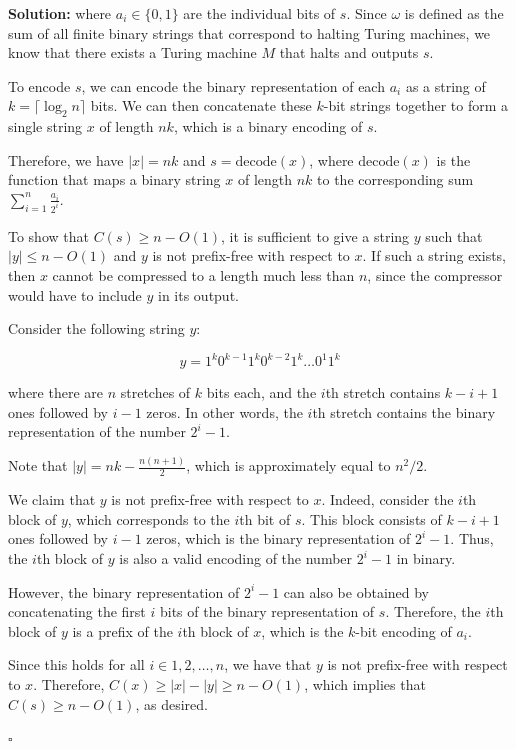 \documentclass[10pt]{article}
\newenvironment{solution}{\textbf{Solution:}}{\hfill$\square$}
\begin{document}
\begin{enumerate}
\begin{solution}
    where $a_i \in \{0,1\}$ are the individual bits of $s$. Since $\omega$ is defined as the sum of all finite binary strings that correspond to halting Turing machines, we know that there exists a Turing machine $M$ that halts and outputs $s$.
    
    To encode $s$, we can encode the binary representation of each $a_i$ as a string of $k = \lceil \log_2 n \rceil$ bits. We can then concatenate these $k$-bit strings together to form a single string $x$ of length $nk$, which is a binary encoding of $s$.
    
    Therefore, we have $|x| = nk$ and $s = \text{decode}(x)$, where $\text{decode}(x)$ is the function that maps a binary string $x$ of length $nk$ to the corresponding sum $\sum_{i=1}^n \frac{a_i}{2^i}$.
    
    To show that $C(s) \geq n-O(1)$, it is sufficient to give a string $y$ such that $|y| \leq n-O(1)$ and $y$ is not prefix-free with respect to $x$. If such a string exists, then $x$ cannot be compressed to a length much less than $n$, since the compressor would have to include $y$ in its output.
    
    Consider the following string $y$:
    
    \[y = 1^{k}0^{k-1}1^{k}0^{k-2}1^{k}\ldots 0^{1}1^{k}\]
    
    where there are $n$ stretches of $k$ bits each, and the $i$th stretch contains $k-i+1$ ones followed by $i-1$ zeros. In other words, the $i$th stretch contains the binary representation of the number $2^i-1$.
    
    Note that $|y| = nk - \frac{n(n+1)}{2}$, which is approximately equal to $n^2/2$.
    
    We claim that $y$ is not prefix-free with respect to $x$. Indeed, consider the $i$th block of $y$, which corresponds to the $i$th bit of $s$. This block consists of $k-i+1$ ones followed by $i-1$ zeros, which is the binary representation of $2^i-1$. Thus, the $i$th block of $y$ is also a valid encoding of the number $2^i-1$ in binary.
    
    However, the binary representation of $2^i-1$ can also be obtained by concatenating the first $i$ bits of the binary representation of $s$. Therefore, the $i$th block of $y$ is a prefix of the $i$th block of $x$, which is the $k$-bit encoding of $a_i$.
    
    Since this holds for all $i \in {1, 2, \ldots, n}$, we have that $y$ is not prefix-free with respect to $x$. Therefore, $C(x) \geq |x| - |y| \geq n - O(1)$, which implies that $C(s) \geq n - O(1)$, as desired.
    

\end{solution}
\end{enumerate}
\end{document}
